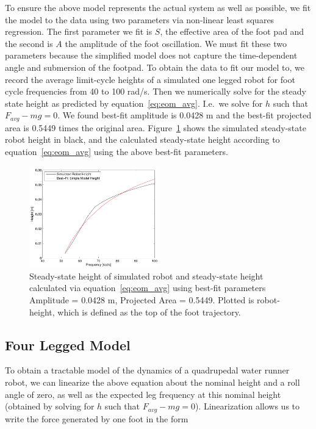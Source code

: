 To ensure the above model represents the actual system as well as possible, we fit the model to the data using two parameters via non-linear least squares regression. The first parameter we fit is $S$, the effective area of the foot pad and the second is $A$ the amplitude of the foot oscillation. We must fit these two parameters because the simplified model does not capture the time-dependent angle and submersion of the footpad. To obtain the data to fit our model to, we record the average limit-cycle heights of a simulated one legged robot for foot cycle frequencies from 40 to 100 rad/s. Then we numerically solve for the steady state height as predicted by equation~\ref{eq:eom_avg}. I.e.\ we solve for $h$ such that $F_{avg} - mg = 0$. We found best-fit amplitude is 0.0428 m and the best-fit projected area is 0.5449 times the original area. Figure~\ref{fig:fitheight} shows the simulated steady-state robot height in black, and the calculated steady-state height according to equation~\ref{eq:eom_avg} using the above best-fit parameters.

\begin{figure}[htb]
	\centering
	\includegraphics[width = 0.5\textwidth]{figures/fitParamsV2.pdf}
	\caption{Steady-state height of simulated robot and steady-state height calculated via equation~\ref{eq:eom_avg} using best-fit parameters Amplitude = 0.0428 m, Projected Area = 0.5449. Plotted is robot-height, which is defined as the top of the foot trajectory.} 
    \label{fig:fitheight}
\end{figure}

\subsection{Four Legged Model}
To obtain a tractable model of the dynamics of a quadrupedal water runner robot, we can linearize the above equation about the nominal height and a roll angle of zero, as well as the expected leg frequency at this nominal height (obtained by solving for $h$ such that $F_{avg} - mg = 0$). Linearization allows us to write the force generated by one foot in the form

